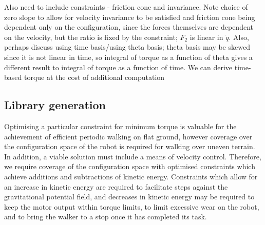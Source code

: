 {\color{red} Also need to include constraints - friction cone and invariance. Note choice of zero slope to allow for velocity invariance to be satisfied and friction cone being dependent only on the configuration, since the forces themselves are dependent on the velocity, but the ratio is fixed by the constraint; $F_2$ is linear in $\dot{q}$. Also, perhaps discuss using time basis/using theta basis; theta basis may be skewed since it is not linear in time, so integral of torque as a function of theta gives a different result to integral of torque as a function of time. We can derive time-based torque at the cost of additional computation}


\subsection{Library generation}
Optimising a particular constraint for minimum torque is valuable for the achievement of efficient periodic walking on flat ground, however coverage over the configuration space of the robot is required for walking over uneven terrain. In addition, a viable solution must include a means of velocity control. Therefore, we require coverage of the configuration space with optimised constraints which achieve additions and subtractions of kinetic energy. Constraints which allow for an increase in kinetic energy are required to facilitate steps against the gravitational potential field, and decreases in kinetic energy may be required to keep the motor output within torque limits, to limit excessive wear on the robot, and to bring the walker to a stop once it has completed its task.